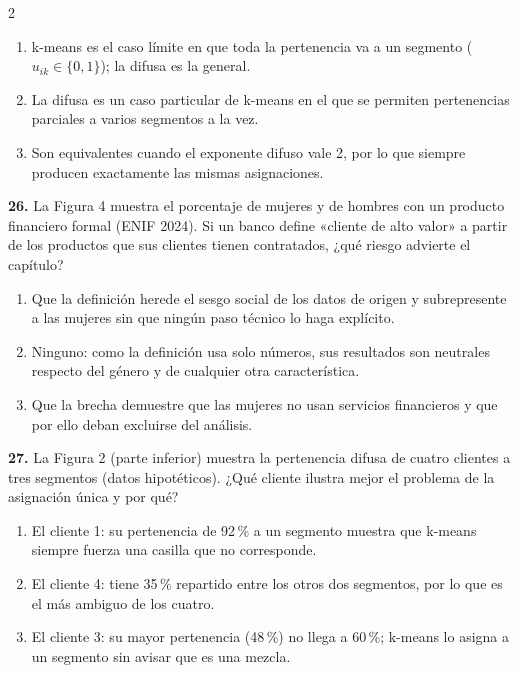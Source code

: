 \documentclass[10pt,letterpaper]{article}
\begin{document}
\begin{multicols}{2}
\begin{enumerate}[label=\alph*),leftmargin=1.1em,itemsep=0pt,topsep=1pt,parsep=0pt,partopsep=0pt]
\item k-means es el caso límite en que toda la pertenencia va a un segmento ($u_{ik}\in\{0,1\}$); la difusa es la general.
\item La difusa es un caso particular de k-means en el que se permiten pertenencias parciales a varios segmentos a la vez.
\item Son equivalentes cuando el exponente difuso vale 2, por lo que siempre producen exactamente las mismas asignaciones.
\end{enumerate}
\vspace{2pt}
\noindent\textbf{26.} La Figura 4 muestra el porcentaje de mujeres y de hombres con un producto financiero formal (ENIF 2024). Si un banco define «cliente de alto valor» a partir de los productos que sus clientes tienen contratados, ¿qué riesgo advierte el capítulo?
\vspace{-3pt}
\begin{enumerate}[label=\alph*),leftmargin=1.1em,itemsep=0pt,topsep=1pt,parsep=0pt,partopsep=0pt]
\item Que la definición herede el sesgo social de los datos de origen y subrepresente a las mujeres sin que ningún paso técnico lo haga explícito.
\item Ninguno: como la definición usa solo números, sus resultados son neutrales respecto del género y de cualquier otra característica.
\item Que la brecha demuestre que las mujeres no usan servicios financieros y que por ello deban excluirse del análisis.
\end{enumerate}
\vspace{2pt}
\noindent\textbf{27.} La Figura 2 (parte inferior) muestra la pertenencia difusa de cuatro clientes a tres segmentos (datos hipotéticos). ¿Qué cliente ilustra mejor el problema de la asignación única y por qué?
\vspace{-3pt}
\begin{enumerate}[label=\alph*),leftmargin=1.1em,itemsep=0pt,topsep=1pt,parsep=0pt,partopsep=0pt]
\item El cliente 1: su pertenencia de 92\,\% a un segmento muestra que k-means siempre fuerza una casilla que no corresponde.
\item El cliente 4: tiene 35\,\% repartido entre los otros dos segmentos, por lo que es el más ambiguo de los cuatro.
\item El cliente 3: su mayor pertenencia (48\,\%) no llega a 60\,\%; k-means lo asigna a un segmento sin avisar que es una mezcla.
\end{enumerate}

\end{multicols}
\end{document}
